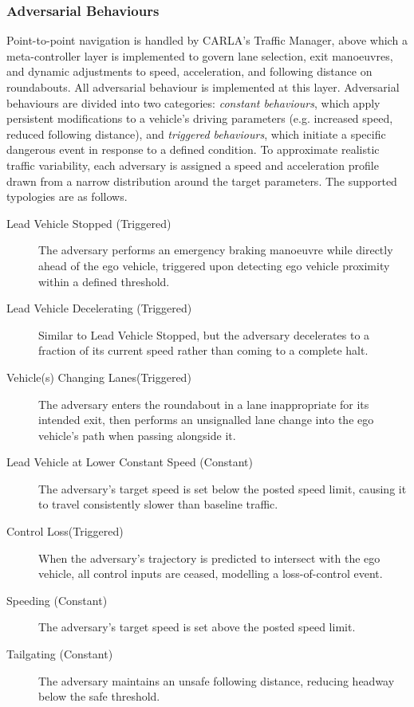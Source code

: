 \subsubsection{Adversarial Behaviours}
Point-to-point navigation is handled by CARLA's Traffic Manager, above which a meta-controller layer is implemented to govern lane selection, exit manoeuvres, and dynamic adjustments to speed, acceleration, and following distance on roundabouts. All adversarial behaviour is implemented at this layer. Adversarial behaviours are divided into two categories: \textit{constant behaviours}, which apply persistent modifications to a vehicle's driving parameters (e.g. increased speed, reduced following distance), and \textit{triggered behaviours}, which initiate a specific dangerous event in response to a defined condition. To approximate realistic traffic variability, each adversary is assigned a speed and acceleration profile drawn from a narrow distribution around the target parameters. The supported typologies are as follows.
\begin{description}
\item[Lead Vehicle Stopped (Triggered)] The adversary performs an emergency braking manoeuvre while directly ahead of the ego vehicle, triggered upon detecting ego vehicle proximity within a defined threshold.
\item[Lead Vehicle Decelerating (Triggered)] Similar to Lead Vehicle Stopped, but the adversary decelerates to a fraction of its current speed rather than coming to a complete halt.
\item[Vehicle(s) Changing Lanes(Triggered)] The adversary enters the roundabout in a lane inappropriate for its intended exit, then performs an unsignalled lane change into the ego vehicle's path when passing alongside it.
\item[Lead Vehicle at Lower Constant Speed (Constant)] The adversary's target speed is set below the posted speed limit, causing it to travel consistently slower than baseline traffic.
\item[Control Loss(Triggered)] When the adversary's trajectory is predicted to intersect with the ego vehicle, all control inputs are ceased, modelling a loss-of-control event.
\item[Speeding (Constant)] The adversary's target speed is set above the posted speed limit.
\item[Tailgating (Constant)] The adversary maintains an unsafe following distance, reducing headway below the safe threshold.
\end{description}

